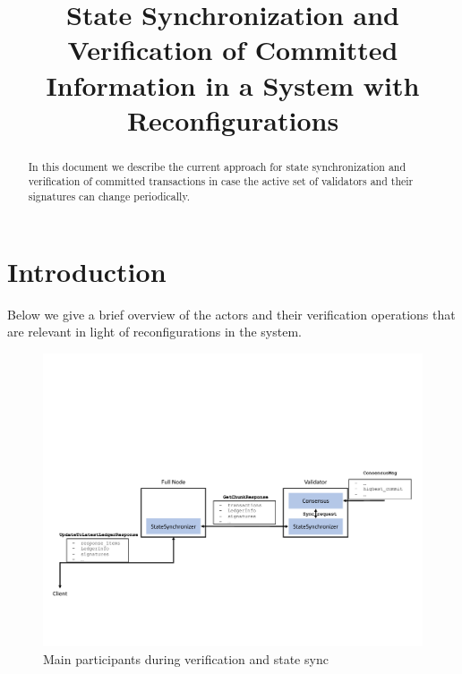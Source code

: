 \documentclass[letterpaper,10pt]{article}
\begin{document}
\title{State Synchronization and Verification of Committed Information in a System with Reconfigurations}
\author{}
\date{}
\maketitle

\begin{abstract}
In this document we describe the current approach for state synchronization and verification of committed transactions in case the active set of validators and their signatures can change periodically.
\end{abstract}

\section{Introduction}
\label{intro}
Below we give a brief overview of the actors and their verification operations that are relevant in light of reconfigurations in the system.

\begin{figure}[ht]
	\centering
	\includegraphics[width=\textwidth]{figures/verification-actors.pdf}
	\caption{\footnotesize{Main participants during verification and state sync}}
	\label{fig:verification-actors}
\end{figure}
\end{document}
